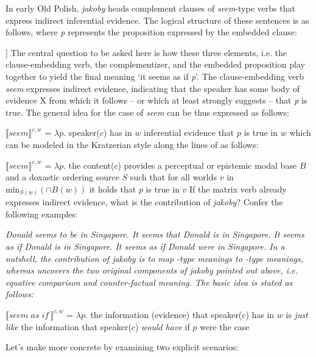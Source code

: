 \documentclass[output=paper]{langsci/langscibook}
\begin{document}
\noindent In early Old Polish, \emph{jakoby} heads complement clauses of \emph{seem}-type verbs that express indirect inferential evidence. The logical structure of these sentences is as follows, where \emph{p} represents the proposition expressed by the embedded clause:

\ea\relax [\emph{seem} [\emph{jakoby} \emph{p}]]  \z
The central question to be asked here is how these three elements, i.e. the clause-embedding verb, the complementizer, and the embedded proposition play together to yield the final meaning `it seems as if \emph{p}'. The clause-embedding verb \emph{seem} expresses indirect evidence, indicating that the speaker has some body of evidence X from which it follows – or which at least strongly suggests – that \emph{p} is true. The general idea for the case of \emph{seem} can be thus expressed as follows:

\ea	\(⟦\textit{seem}⟧^{c,w}\) =  \( \lambda p . \) speaker(\( c \)) has in \( w \) inferential evidence that \( p \) is true in \( w \) \z
which can be modeled in the Kratzerian style along the lines of \textcite{Faller2011} as follows:

\ea	\(⟦\textit{seem}⟧^{c,w}\) =  \( \lambda p . \) the content(\( c \)) provides a perceptual or epistemic modal base \( B \) and a doxastic ordering source \( S \) such that for all worlds \( v \) in \( \text{min}_{S(w)} (\cap B(w))\) it holds that \( p \) is true in \( v \)       \z If the matrix verb already expresses indirect evidence, what is the contribution of \emph{jakoby}? Confer the following examples:

\ea	\ea	\itshape Donald seems to be in Singapore. \label{Donald3}
	\ex	\itshape It seems that Donald is in Singapore. \label{Donald}
	\ex	\itshape It seems as if Donald is in Singapore.
	\ex	\itshape It seems as if Donald were in Singapore. \label{Donald2}
\z
\z In a nutshell, the contribution of \emph{jakoby} is to map -type meanings to -type meanings, whereas   uncovers the two original components of \emph{jakoby} pointed out above, i.e. equative comparison and counter-factual meaning. The basic idea is stated as follows:

\ea\(⟦\textit{seem} \; \textit{as} \; \textit{if}\,⟧^{c,w}\) =  \( \lambda p . \) the information (evidence) that speaker(\( c \)) has in \( w \) is \textit{just like} the information that speaker(\( c \)) \textit{would have} if \( p \) were the case \label{counter}\z

\noindent Let's make  more concrete by examining two explicit scenarios:
\end{document}
